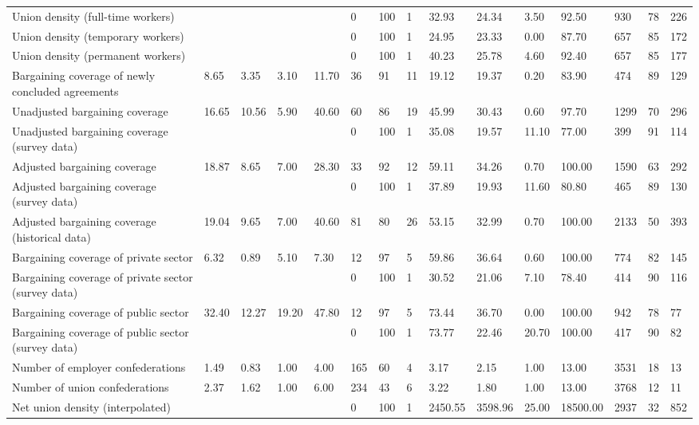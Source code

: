 \begin{longtable}{lllllllllllllll}
Union density (full-time workers) &  &  &  &  & 0 & 100 & 1 & 32.93 & 24.34 & 3.50 & 92.50 & 930 & 78 & 226\\
Union density (temporary workers) &  &  &  &  & 0 & 100 & 1 & 24.95 & 23.33 & 0.00 & 87.70 & 657 & 85 & 172\\
Union density (permanent workers) &  &  &  &  & 0 & 100 & 1 & 40.23 & 25.78 & 4.60 & 92.40 & 657 & 85 & 177\\
\addlinespace
Bargaining coverage of newly concluded agreements & 8.65 & 3.35 & 3.10 & 11.70 & 36 & 91 & 11 & 19.12 & 19.37 & 0.20 & 83.90 & 474 & 89 & 129\\
Unadjusted bargaining coverage & 16.65 & 10.56 & 5.90 & 40.60 & 60 & 86 & 19 & 45.99 & 30.43 & 0.60 & 97.70 & 1299 & 70 & 296\\
Unadjusted bargaining coverage (survey data) &  &  &  &  & 0 & 100 & 1 & 35.08 & 19.57 & 11.10 & 77.00 & 399 & 91 & 114\\
Adjusted bargaining coverage & 18.87 & 8.65 & 7.00 & 28.30 & 33 & 92 & 12 & 59.11 & 34.26 & 0.70 & 100.00 & 1590 & 63 & 292\\
Adjusted bargaining coverage (survey data) &  &  &  &  & 0 & 100 & 1 & 37.89 & 19.93 & 11.60 & 80.80 & 465 & 89 & 130\\
\addlinespace
Adjusted bargaining coverage (historical data) & 19.04 & 9.65 & 7.00 & 40.60 & 81 & 80 & 26 & 53.15 & 32.99 & 0.70 & 100.00 & 2133 & 50 & 393\\
Bargaining coverage of private sector & 6.32 & 0.89 & 5.10 & 7.30 & 12 & 97 & 5 & 59.86 & 36.64 & 0.60 & 100.00 & 774 & 82 & 145\\
Bargaining coverage of private sector (survey data) &  &  &  &  & 0 & 100 & 1 & 30.52 & 21.06 & 7.10 & 78.40 & 414 & 90 & 116\\
Bargaining coverage of public sector & 32.40 & 12.27 & 19.20 & 47.80 & 12 & 97 & 5 & 73.44 & 36.70 & 0.00 & 100.00 & 942 & 78 & 77\\
Bargaining coverage of public sector (survey data) &  &  &  &  & 0 & 100 & 1 & 73.77 & 22.46 & 20.70 & 100.00 & 417 & 90 & 82\\
\addlinespace
Number of employer confederations & 1.49 & 0.83 & 1.00 & 4.00 & 165 & 60 & 4 & 3.17 & 2.15 & 1.00 & 13.00 & 3531 & 18 & 13\\
Number of union confederations & 2.37 & 1.62 & 1.00 & 6.00 & 234 & 43 & 6 & 3.22 & 1.80 & 1.00 & 13.00 & 3768 & 12 & 11\\
Net union density (interpolated) &  &  &  &  & 0 & 100 & 1 & 2450.55 & 3598.96 & 25.00 & 18500.00 & 2937 & 32 & 852\\

\end{longtable}
